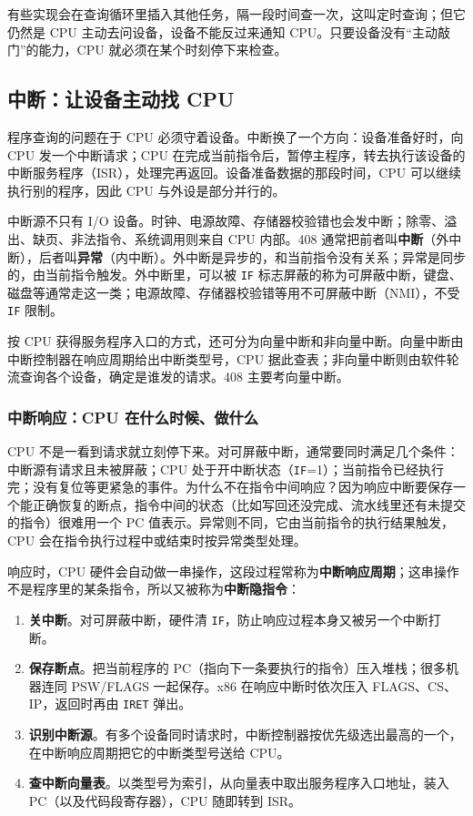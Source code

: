 有些实现会在查询循环里插入其他任务，隔一段时间查一次，这叫定时查询；但它仍然是 CPU 主动去问设备，设备不能反过来通知 CPU。只要设备没有“主动敲门”的能力，CPU 就必须在某个时刻停下来检查。

\subsection{中断：让设备主动找 CPU}

程序查询的问题在于 CPU 必须守着设备。中断换了一个方向：设备准备好时，向 CPU 发一个中断请求；CPU 在完成当前指令后，暂停主程序，转去执行该设备的中断服务程序（ISR），处理完再返回。设备准备数据的那段时间，CPU 可以继续执行别的程序，因此 CPU 与外设是部分并行的。

中断源不只有 I/O 设备。时钟、电源故障、存储器校验错也会发中断；除零、溢出、缺页、非法指令、系统调用则来自 CPU 内部。408 通常把前者叫\textbf{中断}（外中断），后者叫\textbf{异常}（内中断）。外中断是异步的，和当前指令没有关系；异常是同步的，由当前指令触发。外中断里，可以被 \texttt{IF} 标志屏蔽的称为可屏蔽中断，键盘、磁盘等通常走这一类；电源故障、存储器校验错等用不可屏蔽中断（NMI），不受 \texttt{IF} 限制。

按 CPU 获得服务程序入口的方式，还可分为向量中断和非向量中断。向量中断由中断控制器在响应周期给出中断类型号，CPU 据此查表；非向量中断则由软件轮流查询各个设备，确定是谁发的请求。408 主要考向量中断。

\subsubsection{中断响应：CPU 在什么时候、做什么}

CPU 不是一看到请求就立刻停下来。对可屏蔽中断，通常要同时满足几个条件：中断源有请求且未被屏蔽；CPU 处于开中断状态（\texttt{IF}=1）；当前指令已经执行完；没有复位等更紧急的事件。为什么不在指令中间响应？因为响应中断要保存一个能正确恢复的断点，指令中间的状态（比如写回还没完成、流水线里还有未提交的指令）很难用一个 PC 值表示。异常则不同，它由当前指令的执行结果触发，CPU 会在指令执行过程中或结束时按异常类型处理。

响应时，CPU 硬件会自动做一串操作，这段过程常称为\textbf{中断响应周期}；这串操作不是程序里的某条指令，所以又被称为\textbf{中断隐指令}：

\begin{enumerate}
  \item \textbf{关中断}。对可屏蔽中断，硬件清 \texttt{IF}，防止响应过程本身又被另一个中断打断。
  \item \textbf{保存断点}。把当前程序的 PC（指向下一条要执行的指令）压入堆栈；很多机器连同 PSW/FLAGS 一起保存。x86 在响应中断时依次压入 FLAGS、CS、IP，返回时再由 \texttt{IRET} 弹出。
  \item \textbf{识别中断源}。有多个设备同时请求时，中断控制器按优先级选出最高的一个，在中断响应周期把它的中断类型号送给 CPU。
  \item \textbf{查中断向量表}。以类型号为索引，从向量表中取出服务程序入口地址，装入 PC（以及代码段寄存器），CPU 随即转到 ISR。
\end{enumerate}

